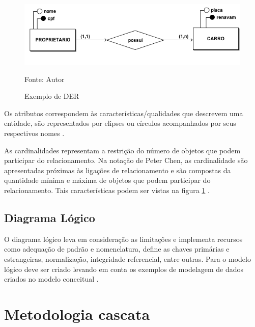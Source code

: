 \begin{figure}[h]
	\centering
	\includegraphics[keepaspectratio=true,scale=0.5]{figuras/figura1.png}
	\caption{Exemplo de DER}
	Fonte: Autor
	\label{figura1}
\end{figure}

Os atributos correspondem às características/qualidades que descrevem uma entidade, são representados por
elipses ou círculos acompanhados por seus respectivos nomes \cite{sistemadebancos}.

As cardinalidades representam a restrição do número de objetos que podem participar do relacionamento. Na notação
de Peter Chen, as cardinalidade são apresentadas próximas às ligações de relacionamento e são compostas da quantidade
mínima e máxima de objetos que podem participar do relacionamento. Tais características podem ser vistas 
na figura \ref{figura1} \cite{sistemadebancos}.

\subsection{Diagrama Lógico}
O diagrama lógico leva em consideração as limitações e implementa recursos como adequação de padrão e nomenclatura, define as
chaves primárias e estrangeiras, normalização, integridade referencial, entre outras. Para o modelo lógico deve ser criado 
levando em conta os exemplos de modelagem de dados criados no modelo conceitual \cite{sistemadebancos}.



\section{Metodologia cascata}

